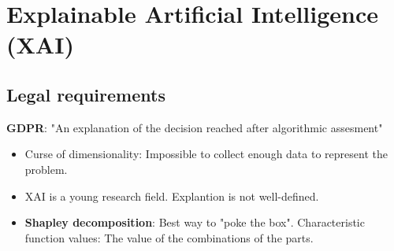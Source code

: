 \section{Explainable Artificial Intelligence (XAI)}
\label{sec:xai}


\subsection{Legal requirements}

\textbf{GDPR}: "An explanation of the decision reached after algorithmic assesment"

\begin{itemize}
    \item Curse of dimensionality: Impossible to collect enough data to represent the problem.
    \item XAI is a young research field. Explantion is not well-defined.
    \item \textbf{Shapley decomposition}: Best way to "poke the box". Characteristic function values: The value of the combinations of the parts.
\end{itemize}